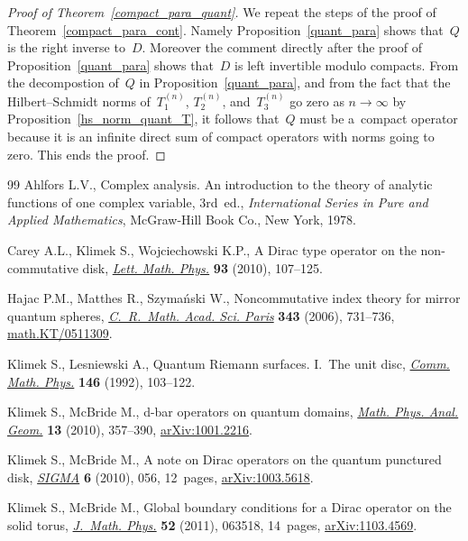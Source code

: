\documentclass[11pt]{article}
\numberwithin{equation}{section}
\begin{document}
\begin{proof}[Proof of Theorem~\ref{compact_para_quant}] We repeat the steps of the proof of Theorem~\ref{compact_para_cont}.
Namely Proposition~\ref{quant_para} shows that~$Q$ is the right inverse to~$D$.
Moreover the comment directly after the proof of Proposition~\ref{quant_para} shows that~$D$ is left invertible modulo
compacts.
From the decompostion of~$Q$ in Proposition~\ref{quant_para}, and from the fact that the Hilbert--Schmidt norms of~$T_1^{(n)}$, $T_2^{(n)}$, and~$T_3^{(n)}$ go zero as $n\to\infty$ by Proposition~\ref{hs_norm_quant_T}, it follows that~$Q$ must be a~compact operator because it is an inf\/inite direct sum of compact operators with norms going to zero.
This ends the proof.
\end{proof}
\begin{thebibliography}{99}
Ahlfors L.V., Complex analysis. An introduction to the theory of analytic
  functions of one complex variable, 3rd~ed., \textit{International Series in Pure and
  Applied Mathematics}, McGraw-Hill Book Co., New York, 1978.

Carey A.L., Klimek S., Wojciechowski K.P., A {D}irac type operator on the
  non-commutative disk, \href{http://dx.doi.org/10.1007/s11005-010-0391-7}{\textit{Lett. Math. Phys.}} \textbf{93} (2010),
  107--125.

Hajac P.M., Matthes R., Szyma{\'n}ski W., Noncommutative index theory for
  mirror quantum spheres, \href{http://dx.doi.org/10.1016/j.crma.2006.09.021}{\textit{C.~R.~Math. Acad. Sci. Paris}} \textbf{343}
  (2006), 731--736, \href{http://arxiv.org/abs/math.KT/0511309}{math.KT/0511309}.

Klimek S., Lesniewski A., Quantum {R}iemann surfaces. {I}.~{T}he unit disc,
  \href{http://dx.doi.org/10.1007/BF02099210}{\textit{Comm. Math. Phys.}} \textbf{146} (1992), 103--122.

Klimek S., McBride M., d-bar operators on quantum domains, \href{http://dx.doi.org/10.1007/s11040-010-9084-9}{\textit{Math. Phys.
  Anal. Geom.}} \textbf{13} (2010), 357--390, \href{http://arxiv.org/abs/1001.2216}{arXiv:1001.2216}.

Klimek S., McBride M., A note on {D}irac operators on the quantum punctured
  disk, \href{http://dx.doi.org/10.3842/SIGMA.2010.056}{\textit{SIGMA}} \textbf{6} (2010), 056, 12~pages, \href{http://arxiv.org/abs/1003.5618}{arXiv:1003.5618}.

Klimek S., McBride M., Global boundary conditions for a {D}irac operator on the
  solid torus, \href{http://dx.doi.org/10.1063/1.3602276}{\textit{J.~Math. Phys.}} \textbf{52} (2011), 063518, 14~pages,
  \href{http://arxiv.org/abs/1103.4569}{arXiv:1103.4569}.


\end{thebibliography}
\end{document}
